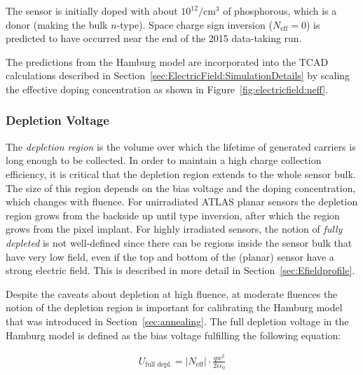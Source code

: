  The sensor is initially doped with about $10^{12}/\text{cm}^3$ of phosphorous, which is a donor (making the bulk $n$-type).  Space charge sign inversion ($N_\text{eff}=0$) is predicted to have occurred near the end of the 2015 data-taking run.

The predictions from the Hamburg model are incorporated into the TCAD calculations described in Section~\ref{sec:ElectricField:SimulationDetails} by scaling the effective doping concentration as shown in Figure~\ref{fig:electricfield:neff}.    

\subsubsection{Depletion Voltage}
\label{sec:depletionvoltage}

The \textit{depletion region} is the volume over which the lifetime of generated carriers is long enough to be collected.  In order to maintain a high charge collection efficiency, it is critical that the depletion region extends to the whole sensor bulk.  The size of this region depends on the bias voltage and the doping concentration, which changes with fluence.   For unirradiated ATLAS planar sensors the depletion region grows from the backside up until type inversion, after which the region grows from the pixel implant.  For highly irradiated sensors, the notion of \textit{fully depleted} is not well-defined since there can be regions inside the sensor bulk that have very low field, even if the top and bottom of the (planar) sensor have a strong electric field.  This is described in more detail in Section~\ref{sec:Efieldprofile}.

 Despite the caveats about depletion at high fluence, at moderate fluences the notion of the depletion region is important for calibrating the Hamburg model that was introduced in Section~\ref{sec:annealing}.  The full depletion voltage in the Hamburg model is defined as the bias voltage fulfilling the following equation:

\begin{align}
\label{eq:hamburg13}
U_\text{full depl.} = |N_\text{eff}| \cdot \frac{qw^2}{2\epsilon\epsilon_0}
\end{align}

